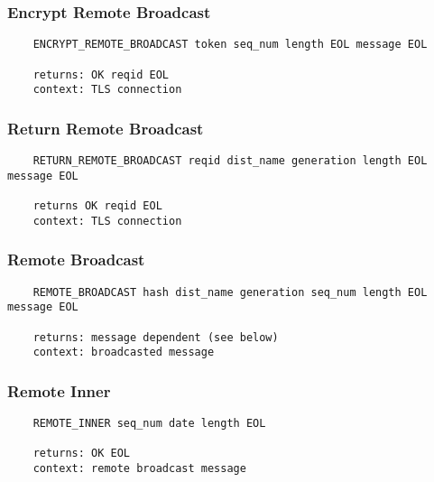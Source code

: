 \documentclass[letterpaper,11pt,oneside]{article}
\begin{document}
\subsubsection{Encrypt Remote Broadcast}

\vspace{10pt}
\begin{verbatim}
    ENCRYPT_REMOTE_BROADCAST token seq_num length EOL message EOL

    returns: OK reqid EOL
    context: TLS connection
\end{verbatim}
\vspace{10pt}

\subsubsection{Return Remote Broadcast}

\vspace{10pt}
\begin{verbatim}
    RETURN_REMOTE_BROADCAST reqid dist_name generation length EOL message EOL

    returns OK reqid EOL
    context: TLS connection
\end{verbatim}
\vspace{10pt}

\subsubsection{Remote Broadcast}

\vspace{10pt}
\begin{verbatim}
    REMOTE_BROADCAST hash dist_name generation seq_num length EOL message EOL

    returns: message dependent (see below)
    context: broadcasted message
\end{verbatim}
\vspace{10pt}

\subsubsection{Remote Inner}

\vspace{10pt}
\begin{verbatim}
    REMOTE_INNER seq_num date length EOL

    returns: OK EOL
    context: remote broadcast message
\end{verbatim}
\end{document}
